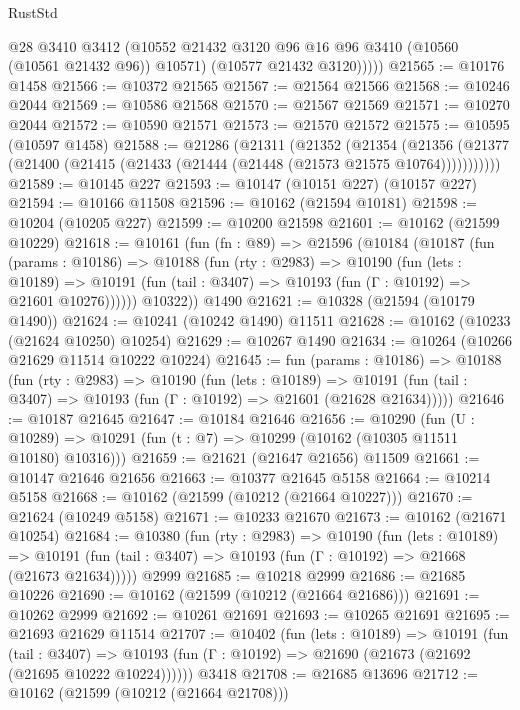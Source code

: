 \begin{lexlean}{RustStd}
\begin{coremodule}
            @28
            @3410
            @3412
            (@10552 @21432 @3120 @96 @16 @96 @3410 (@10560 (@10561 @21432 @96)) @10571)
            (@10577 @21432 @3120)))))
@21565 := @10176 @1458
@21566 := @10372 @21565
@21567 := @21564 @21566
@21568 := @10246 @2044
@21569 := @10586 @21568
@21570 := @21567 @21569
@21571 := @10270 @2044
@21572 := @10590 @21571
@21573 := @21570 @21572
@21575 := @10595 (@10597 @1458)
@21588 := @21286
    (@21311
      (@21352
        (@21354
          (@21356 (@21377 (@21400 (@21415 (@21433 (@21444 (@21448 (@21573 @21575 @10764)))))))))))
@21589 := @10145 @227
@21593 := @10147 (@10151 @227) (@10157 @227)
@21594 := @10166 @11508
@21596 := @10162 (@21594 @10181)
@21598 := @10204 (@10205 @227)
@21599 := @10200 @21598
@21601 := @10162 (@21599 @10229)
@21618 := @10161
    (fun (fn : @89) =>
    @21596
      (@10184
        (@10187
          (fun (params : @10186) =>
          @10188
            (fun (rty : @2983) =>
            @10190
              (fun (lets : @10189) =>
              @10191 (fun (tail : @3407) => @10193 (fun (Γ : @10192) => @21601 @10276))))))
        @10322))
    @1490
@21621 := @10328 (@21594 (@10179 @1490))
@21624 := @10241 (@10242 @1490) @11511
@21628 := @10162 (@10233 (@21624 @10250) @10254)
@21629 := @10267 @1490
@21634 := @10264 (@10266 @21629 @11514 @10222 @10224)
@21645 := fun (params : @10186) =>
  @10188
    (fun (rty : @2983) =>
    @10190
      (fun (lets : @10189) =>
      @10191 (fun (tail : @3407) => @10193 (fun (Γ : @10192) => @21601 (@21628 @21634)))))
@21646 := @10187 @21645
@21647 := @10184 @21646
@21656 := @10290
    (fun (U : @10289) => @10291 (fun (t : @7) => @10299 (@10162 (@10305 @11511 @10180) @10316)))
@21659 := @21621 (@21647 @21656) @11509
@21661 := @10147 @21646 @21656
@21663 := @10377 @21645 @5158
@21664 := @10214 @5158
@21668 := @10162 (@21599 (@10212 (@21664 @10227)))
@21670 := @21624 (@10249 @5158)
@21671 := @10233 @21670
@21673 := @10162 (@21671 @10254)
@21684 := @10380
    (fun (rty : @2983) =>
    @10190
      (fun (lets : @10189) =>
      @10191 (fun (tail : @3407) => @10193 (fun (Γ : @10192) => @21668 (@21673 @21634)))))
    @2999
@21685 := @10218 @2999
@21686 := @21685 @10226
@21690 := @10162 (@21599 (@10212 (@21664 @21686)))
@21691 := @10262 @2999
@21692 := @10261 @21691
@21693 := @10265 @21691
@21695 := @21693 @21629 @11514
@21707 := @10402
    (fun (lets : @10189) =>
    @10191
      (fun (tail : @3407) =>
      @10193 (fun (Γ : @10192) => @21690 (@21673 (@21692 (@21695 @10222 @10224))))))
    @3418
@21708 := @21685 @13696
@21712 := @10162 (@21599 (@10212 (@21664 @21708)))

\end{coremodule}
\end{lexlean}
